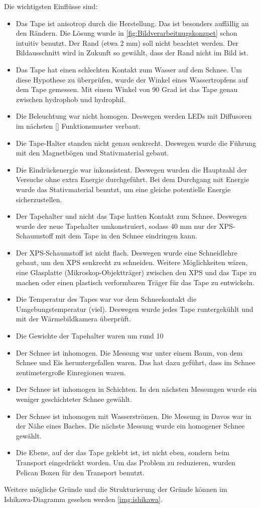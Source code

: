 Die wichtigsten Einflüsse sind:
\begin{itemize}
\item Das Tape ist anisotrop durch die Herstellung. Das ist besonders auffällig an den Rändern. Die Lösung wurde in \ref{fig:Bildverarbeitnugskonzpet} schon intuitiv benutzt. Der Rand (etwa 2 mm) soll nicht beachtet werden. Der Bildausschnitt wird in Zukunft so gewählt, dass der Rand nicht im Bild ist.
\item Das Tape hat einen schlechten Kontakt zum Wasser auf dem Schnee. Um diese Hypothese zu überprüfen, wurde der Winkel eines Wassertropfens auf dem Tape gemessen. Mit einem Winkel von 90 Grad ist das Tape genau zwischen hydrophob und hydrophil.
\item Die Beleuchtung war nicht homogen. Deswegen werden LEDs mit Diffusoren im nächsten \ref{} Funktionsmuster verbaut.
\item Die Tape-Halter standen nicht genau senkrecht. Deswegen wurde die Führung mit den Magnetbögen und Stativmaterial gebaut.
\item Die Eindrückenergie war inkonsistent. Deswegen wurden die Hauptzahl der Versuche ohne extra Energie durchgeführt. Bei dem Durchgang mit Energie wurde das Stativmaterial benutzt, um eine gleiche potentielle Energie sicherzustellen.
\item Der Tapehalter und nicht das Tape hatten Kontakt zum Schnee. Deswegen wurde der neue Tapehalter umkonstruiert, sodass 40 mm nur der XPS-Schaumstoff mit dem Tape in den Schnee eindringen kann.
\item Der XPS-Schaumstoff ist nicht flach. Deswegen wurde eine Schneidlehre gebaut, um den XPS senkrecht zu schneiden. Weitere Möglichkeiten wären, eine Glasplatte (Mikroskop-Objektträger) zwischen den XPS und das Tape zu machen oder einen plastisch verformbaren Träger für das Tape zu entwickeln.
\item Die Temperatur des Tapes war vor dem Schneekontakt die Umgebungstemperatur (viel). Deswegen wurde jedes Tape runtergekühlt und mit der Wärmebildkamera überprüft.
\item Die Gewichte der Tapehalter waren um rund 10 %
\item Der Schnee ist inhomogen. Die Messung war unter einem Baum, von dem Schnee und Eis heruntergefallen waren. Das hat dazu geführt, dass im Schnee zentimetergroße Einregionen waren.
\item Der Schnee ist inhomogen in Schichten. In den nächsten Messungen wurde ein weniger geschichteter Schnee gewählt.
\item Der Schnee ist inhomogen mit Wasserströmen. Die Messung in Davos war in der Nähe eines Baches. Die nächste Messung wurde ein homogener Schnee gewählt.
\item Die Ebene, auf der das Tape geklebt ist, ist nicht eben, sondern beim Transport eingedrückt worden. Um das Problem zu reduzieren, wurden Pelican Boxen für den Transport benutzt.
\end{itemize}

Weitere mögliche Gründe und die Strukturierung der Gründe können im Ishikawa-Diagramm gesehen werden \ref{img:ishikawa}.
